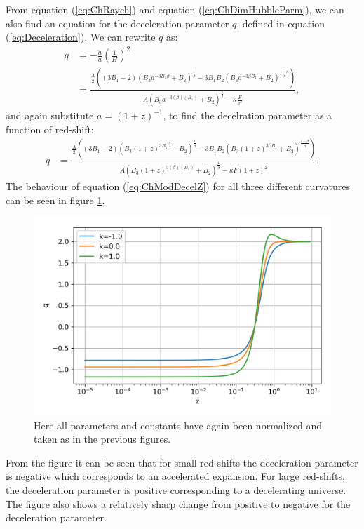 \documentclass[a4paper, 11pt]{FSKH_623_Report}
\numberwithin{equation}{section}
\newcommand{\brac}[1]{\left(#1\right)}
\begin{document}
From equation (\ref{eq:ChRaych}) and equation (\ref{eq:ChDimHubbleParm}), we can also find an equation for the deceleration parameter $q$, defined in equation (\ref{eq:Deceleration}). We can rewrite $q$ as:
\begin{equation}\label{eq:ChModDecel}
\begin{split}
q &= -\frac{\ddot{a}}{a}\brac{\frac{1}{H}}^{2}         \\
&= \frac{\frac{A}{2}\brac{\brac{3B_{1}-2}\brac{B_{3}a^{-3B_{1}\beta}+B_{2}}^{\frac{1}{\beta}}-3B_{1}B_{2}\brac{B_{3}a^{-3\beta B_{1}}+B_{2}}^{\frac{1-\beta}{\beta}}}}{A\brac{B_{3}a^{-3\brac{\beta}\brac{B_{1}}}+B_{2}}^{\frac{1}{\beta}} -\kappa\frac{F}{a^{2}}},
\end{split}
\end{equation}
and again substitute $a=\brac{1+z}^{-1}$, to find the decelration parameter as a function of red-shift:
\begin{equation}\label{eq:ChModDecelZ}
\begin{split}
q &= \frac{\frac{A}{2}\brac{\brac{3B_{1}-2}\brac{B_{3}\brac{1+z}^{3B_{1}\beta}+B_{2}}^{\frac{1}{\beta}}-3B_{1}B_{2}\brac{B_{3}\brac{1+z}^{3\beta B_{1}}+B_{2}}^{\frac{1-\beta}{\beta}}}}{A\brac{B_{3}\brac{1+z}^{3\brac{\beta}\brac{B_{1}}}+B_{2}}^{\frac{1}{\beta}} -\kappa F\brac{1+z}^{2}}.
\end{split}
\end{equation}
The behaviour of equation (\ref{eq:ChModDecelZ}) for all three different curvatures can be seen in figure \ref{fig:ChDecel}. 
\begin{figure}[H]
\centering
\includegraphics[scale=0.8]{Figures/ch_q.jpg}
\caption{Here all parameters and constants have again been normalized and taken as in the previous figures.}
\label{fig:ChDecel}
\end{figure}
From the figure it can be seen that for small red-shifts the deceleration parameter is negative which corresponds to an accelerated expansion. For large red-shifts, the deceleration parameter is positive corresponding to a decelerating universe. The figure also shows a relatively sharp change from positive to negative for the deceleration parameter.
\end{document}
